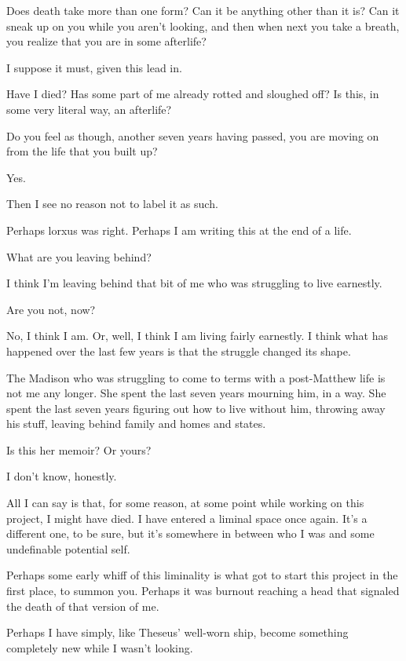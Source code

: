 \label{ally:30}
\begin{paracol}{2}
  \begin{leftcolumn}
\noindent Does death take more than one form? Can it be anything other than it is? Can it sneak up on you while you aren't looking, and then when next you take a breath, you realize that you are in some afterlife?

\begin{ally}
I suppose it must, given this lead in.
\end{ally}
Have I died? Has some part of me already rotted and sloughed off? Is this, in some very literal way, an afterlife?

\begin{ally}
Do you feel as though, another seven years having passed, you are moving on from the life that you built up?
\end{ally}
Yes.

\begin{ally}
Then I see no reason not to label it as such.
\end{ally}
Perhaps lorxus was right. Perhaps I am writing this at the end of a life.

\begin{ally}
What are you leaving behind?
\end{ally}
I think I'm leaving behind that bit of me who was struggling to live earnestly.

\begin{ally}
Are you not, now?
\end{ally}
No, I think I am. Or, well, I think I am living fairly earnestly. I think what has happened over the last few years is that the struggle changed its shape.

The Madison who was struggling to come to terms with a post-Matthew life is not me any longer. She spent the last seven years mourning him, in a way. She spent the last seven years figuring out how to live without him, throwing away his stuff, leaving behind family and homes and states.

\begin{ally}
Is this her memoir? Or yours?
\end{ally}
I don't know, honestly.

All I can say is that, for some reason, at some point while working on this project, I might have died. I have entered a liminal space once again. It's a different one, to be sure, but it's somewhere in between who I was and some undefinable potential self.

Perhaps some early whiff of this liminality is what got to start this project in the first place, to summon you. Perhaps it was burnout reaching a head that signaled the death of that version of me.

Perhaps I have simply, like Theseus' well-worn ship, become something completely new while I wasn't looking.
\newpage
  \end{leftcolumn}
\end{paracol}
